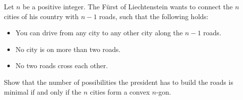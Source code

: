Let $n$ be a positive integer. The Fürst of Liechtenstein wants to connect the $n$ cities of
his country with $n-1$ roads, such that the following holds:
\begin{itemize}
    \item You can drive from any city to any other city along the $n-1$ roads.
    \item No city is on more than two roads.
    \item No two roads cross each other.
\end{itemize}
Show that the number of possibilities the president has to build the roads is minimal
if and only if the $n$ cities form a convex $n$-gon.